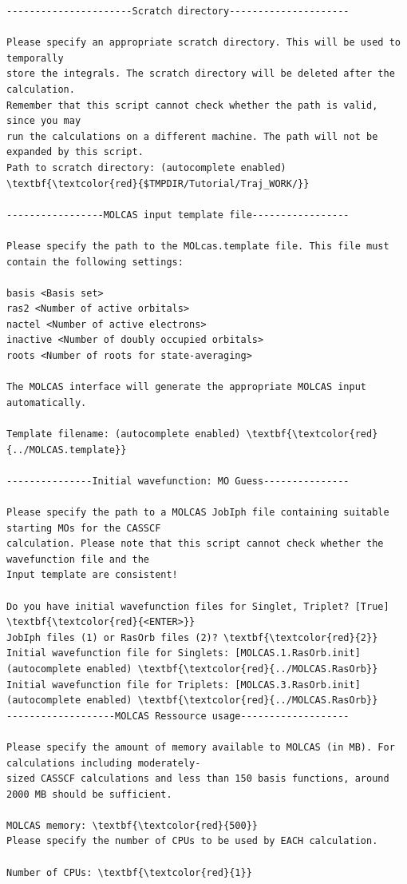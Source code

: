 \documentclass[a4paper,11pt,DIV=15,openany]{scrbook}
\begin{document}
\begin{oframed}
\begin{Verbatim}[commandchars=\\\{\}]
----------------------Scratch directory---------------------

Please specify an appropriate scratch directory. This will be used to temporally 
store the integrals. The scratch directory will be deleted after the calculation. 
Remember that this script cannot check whether the path is valid, since you may 
run the calculations on a different machine. The path will not be expanded by this script.
Path to scratch directory: (autocomplete enabled) \textbf{\textcolor{red}{$TMPDIR/Tutorial/Traj_WORK/}}

-----------------MOLCAS input template file-----------------

Please specify the path to the MOLcas.template file. This file must contain the following settings:

basis <Basis set>
ras2 <Number of active orbitals>
nactel <Number of active electrons>
inactive <Number of doubly occupied orbitals>
roots <Number of roots for state-averaging>

The MOLCAS interface will generate the appropriate MOLCAS input automatically.

Template filename: (autocomplete enabled) \textbf{\textcolor{red}{../MOLCAS.template}}

---------------Initial wavefunction: MO Guess---------------

Please specify the path to a MOLCAS JobIph file containing suitable starting MOs for the CASSCF 
calculation. Please note that this script cannot check whether the wavefunction file and the 
Input template are consistent!

Do you have initial wavefunction files for Singlet, Triplet? [True] \textbf{\textcolor{red}{<ENTER>}}
JobIph files (1) or RasOrb files (2)? \textbf{\textcolor{red}{2}}
Initial wavefunction file for Singlets: [MOLCAS.1.RasOrb.init] (autocomplete enabled) \textbf{\textcolor{red}{../MOLCAS.RasOrb}}
Initial wavefunction file for Triplets: [MOLCAS.3.RasOrb.init] (autocomplete enabled) \textbf{\textcolor{red}{../MOLCAS.RasOrb}}
-------------------MOLCAS Ressource usage-------------------

Please specify the amount of memory available to MOLCAS (in MB). For calculations including moderately-
sized CASSCF calculations and less than 150 basis functions, around 2000 MB should be sufficient.

MOLCAS memory: \textbf{\textcolor{red}{500}}
Please specify the number of CPUs to be used by EACH calculation.

Number of CPUs: \textbf{\textcolor{red}{1}}


\end{Verbatim}
\end{oframed}
\end{document}
